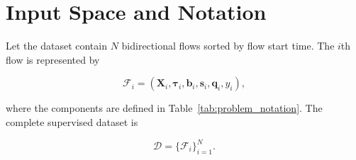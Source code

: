 \documentclass[11pt,fleqn]{report}
\begin{document}

\section{Input Space and Notation}
\label{subsec:input_notation}

Let the dataset contain $N$ bidirectional flows sorted by flow start time. The
$i$th flow is represented by

\begin{equation}
\mathcal{F}_i =
\left(
    \mathbf{X}_i,
    \boldsymbol{\tau}_i,
    \mathbf{b}_i,
    \mathbf{s}_i,
    \mathbf{q}_i,
    y_i
\right),
\end{equation}

where the components are defined in
Table~\ref{tab:problem_notation}. The complete supervised dataset is

\begin{equation}
\mathcal{D}=\{\mathcal{F}_i\}_{i=1}^{N}.
\end{equation}
\end{document}
